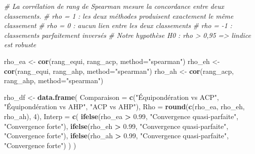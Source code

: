 \documentclass[
]{article}
\newenvironment{Shaded}{\begin{snugshade}}{\end{snugshade}}
\newcommand{\AttributeTok}[1]{\textcolor[rgb]{0.13,0.29,0.53}{#1}}
\newcommand{\CommentTok}[1]{\textcolor[rgb]{0.56,0.35,0.01}{\textit{#1}}}
\newcommand{\DecValTok}[1]{\textcolor[rgb]{0.00,0.00,0.81}{#1}}
\newcommand{\FloatTok}[1]{\textcolor[rgb]{0.00,0.00,0.81}{#1}}
\newcommand{\FunctionTok}[1]{\textcolor[rgb]{0.13,0.29,0.53}{\textbf{#1}}}
\newcommand{\NormalTok}[1]{#1}
\newcommand{\OtherTok}[1]{\textcolor[rgb]{0.56,0.35,0.01}{#1}}
\newcommand{\SpecialCharTok}[1]{\textcolor[rgb]{0.81,0.36,0.00}{\textbf{#1}}}
\newcommand{\StringTok}[1]{\textcolor[rgb]{0.31,0.60,0.02}{#1}}
\begin{document}
\begin{Shaded}
\begin{Highlighting}[]
\CommentTok{\# La corrélation de rang de Spearman mesure la concordance entre deux classements.}
\CommentTok{\# rho = 1   : les deux méthodes produisent exactement le même classement}
\CommentTok{\# rho = 0   : aucun lien entre les deux classements}
\CommentTok{\# rho = {-}1  : classements parfaitement inversés}
\CommentTok{\# Notre hypothèse H0 : rho \textgreater{} 0,95 =\textgreater{} l\textquotesingle{}indice est robuste}

\NormalTok{rho\_ea }\OtherTok{\textless{}{-}} \FunctionTok{cor}\NormalTok{(rang\_equi, rang\_acp, }\AttributeTok{method=}\StringTok{"spearman"}\NormalTok{)}
\NormalTok{rho\_eh }\OtherTok{\textless{}{-}} \FunctionTok{cor}\NormalTok{(rang\_equi, rang\_ahp, }\AttributeTok{method=}\StringTok{"spearman"}\NormalTok{)}
\NormalTok{rho\_ah }\OtherTok{\textless{}{-}} \FunctionTok{cor}\NormalTok{(rang\_acp,  rang\_ahp, }\AttributeTok{method=}\StringTok{"spearman"}\NormalTok{)}

\NormalTok{rho\_df }\OtherTok{\textless{}{-}} \FunctionTok{data.frame}\NormalTok{(}
  \AttributeTok{Comparaison =} \FunctionTok{c}\NormalTok{(}\StringTok{"Équipondération vs ACP"}\NormalTok{,}
                  \StringTok{"Équipondération vs AHP"}\NormalTok{,}
                  \StringTok{"ACP vs AHP"}\NormalTok{),}
  \AttributeTok{Rho         =} \FunctionTok{round}\NormalTok{(}\FunctionTok{c}\NormalTok{(rho\_ea, rho\_eh, rho\_ah), }\DecValTok{4}\NormalTok{),}
  \AttributeTok{Interp      =} \FunctionTok{c}\NormalTok{(}
    \FunctionTok{ifelse}\NormalTok{(rho\_ea }\SpecialCharTok{\textgreater{}} \FloatTok{0.99}\NormalTok{, }\StringTok{"Convergence quasi{-}parfaite"}\NormalTok{, }\StringTok{"Convergence forte"}\NormalTok{),}
    \FunctionTok{ifelse}\NormalTok{(rho\_eh }\SpecialCharTok{\textgreater{}} \FloatTok{0.99}\NormalTok{, }\StringTok{"Convergence quasi{-}parfaite"}\NormalTok{, }\StringTok{"Convergence forte"}\NormalTok{),}
    \FunctionTok{ifelse}\NormalTok{(rho\_ah }\SpecialCharTok{\textgreater{}} \FloatTok{0.99}\NormalTok{, }\StringTok{"Convergence quasi{-}parfaite"}\NormalTok{, }\StringTok{"Convergence forte"}\NormalTok{)}
\NormalTok{  )}
\NormalTok{)}


\end{Highlighting}
\end{Shaded}
\end{document}
